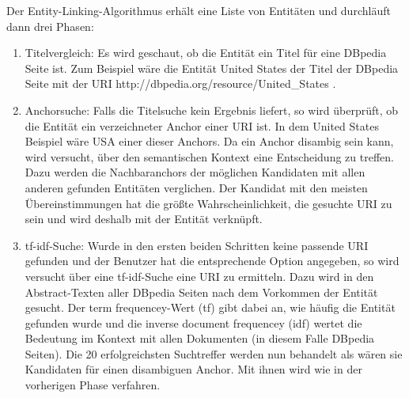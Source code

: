 \documentclass[11pt, a4paper, oneside]{Thesis} %
\begin{document}
Der Entity-Linking-Algorithmus erh\"alt eine Liste von Entit\"aten und durchl\"auft dann drei Phasen:
\begin{enumerate}
\item Titelvergleich: Es wird geschaut, ob die Entit\"at ein Titel f\"ur eine DBpedia Seite ist. Zum Beispiel w\"are die Entit\"at \glqq United States\grqq{} der Titel der DBpedia Seite mit der URI \glqq http://dbpedia.org/resource/United\_States\grqq{} .

\item Anchorsuche: Falls die Titelsuche kein Ergebnis liefert, so wird \"uberpr\"uft, ob die Entit\"at ein verzeichneter Anchor einer URI ist. In dem United States Beispiel w\"are \glqq USA\grqq{} einer dieser Anchors. Da ein Anchor disambig sein kann, wird versucht, \"uber den semantischen Kontext eine Entscheidung zu treffen. Dazu werden die Nachbaranchors der möglichen Kandidaten mit allen anderen gefunden Entit\"aten verglichen. Der Kandidat mit den meisten \"Ubereinstimmungen hat die grö\ss te Wahrscheinlichkeit, die gesuchte URI zu sein und wird deshalb mit der Entit\"at verkn\"upft.

\item tf-idf-Suche: Wurde in den ersten beiden Schritten keine passende URI gefunden und der Benutzer hat die entsprechende Option angegeben, so wird versucht \"uber eine tf-idf-Suche eine URI zu ermitteln. Dazu wird in den Abstract-Texten aller DBpedia Seiten nach dem Vorkommen der Entit\"at gesucht. Der \grqq term frequencey\grqq{}-Wert (tf) gibt dabei an, wie h\"aufig die Entit\"at gefunden wurde und die \grqq inverse document frequencey\grqq{} (idf) wertet die Bedeutung im Kontext mit allen Dokumenten (in diesem Falle DBpedia Seiten). Die 20 erfolgreichsten Suchtreffer werden nun behandelt als w\"aren sie Kandidaten f\"ur einen disambiguen Anchor. Mit ihnen wird wie in der vorherigen Phase verfahren.
\end{enumerate}
\end{document}
